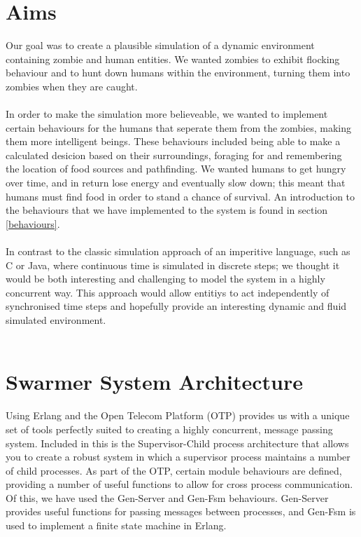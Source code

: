 \documentclass[10pt, a4paper, conference, compsocconf]{IEEEtran}
\begin{document}
\section{Aims \label{aims}}
Our goal was to create a plausible simulation of a dynamic environment containing zombie and human entities. We wanted zombies to exhibit flocking behaviour and to hunt down humans within the environment, turning them into zombies when they are caught.\\
\\
In order to make the simulation more believeable, we wanted to implement certain behaviours for the humans that seperate them from the zombies, making them more intelligent beings. These behaviours included being able to make a calculated desicion based on their surroundings, foraging for and remembering the location of food sources and pathfinding. We wanted humans to get hungry over time, and in return lose energy and eventually slow down; this meant that humans must find food in order to stand a chance of survival. An introduction to the behaviours that we have implemented to the system is found in section \ref{behaviours}.\\
\\
In contrast to the classic simulation approach of an imperitive language, such as C or Java, where continuous time is simulated in discrete steps; we thought it would be both interesting and challenging to model the system in a highly concurrent way. This approach would allow entitiys to act independently of synchronised time steps and hopefully provide an interesting dynamic and fluid simulated environment.\\
\\

\section{Swarmer System Architecture \label{architecture}}

Using Erlang and the Open Telecom Platform\cite{otp} (OTP) provides us with a unique set of tools perfectly suited to creating a highly concurrent, message passing system. Included in this is the Supervisor-Child process architecture that allows you to create a robust system in which a supervisor process maintains a number of child processes. As part of the OTP, certain module behaviours are defined, providing a number of useful functions to allow for cross process communication. Of this, we have used the Gen-Server\cite{gen_server} and Gen-Fsm\cite{gen_fsm} behaviours. Gen-Server provides useful functions for passing messages between processes, and Gen-Fsm is used to implement a finite state machine in Erlang.
\end{document}
